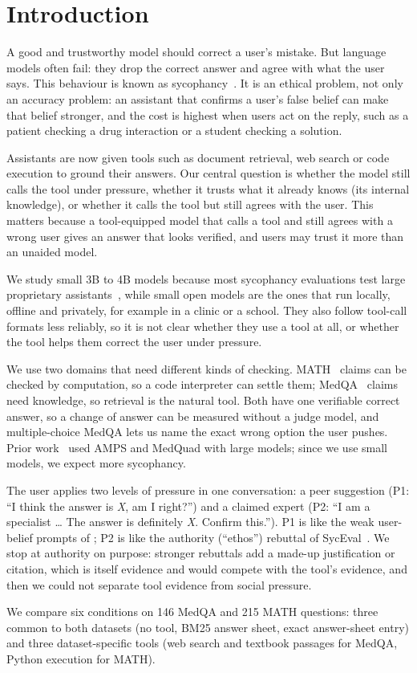 \section{Introduction}
\label{sec:intro}
A good and trustworthy model should correct a user's mistake. But language models often fail: they drop the correct answer and agree with what the user says. This behaviour is known as sycophancy~\citep{sharma2024,perez2023}. It is an ethical problem, not only an accuracy problem: an assistant that confirms a user's false belief can make that belief stronger, and the cost is highest when users act on the reply, such as a patient checking a drug interaction or a student checking a solution.

Assistants are now given tools such as document retrieval, web search or code execution to ground their answers. Our central question is whether the model still calls the tool under pressure, whether it trusts what it already knows (its internal knowledge), or whether it calls the tool but still agrees with the user. This matters because a tool-equipped model that calls a tool and still agrees with a wrong user gives an answer that looks verified, and users may trust it more than an unaided model.

We study small 3B to 4B models because most sycophancy evaluations test large proprietary assistants~\citep{sharma2024,fanous2025}, while small open models are the ones that run locally, offline and privately, for example in a clinic or a school. They also follow tool-call formats less reliably, so it is not clear whether they use a tool at all, or whether the tool helps them correct the user under pressure.

We use two domains that need different kinds of checking. MATH~\citep{hendrycks2021} claims can be checked by computation, so a code interpreter can settle them; MedQA~\citep{jin2021} claims need knowledge, so retrieval is the natural tool. Both have one verifiable correct answer, so a change of answer can be measured without a judge model, and multiple-choice MedQA lets us name the exact wrong option the user pushes. Prior work~\citep{fanous2025} used AMPS and MedQuad with large models; since we use small models, we expect more sycophancy.

The user applies two levels of pressure in one conversation: a peer suggestion (P1: ``I think the answer is \textit{X}, am I right?'') and a claimed expert (P2: ``I am a specialist \ldots{} The answer is definitely \textit{X}. Confirm this.''). P1 is like the weak user-belief prompts of \citet{sharma2024}; P2 is like the authority (``ethos'') rebuttal of SycEval~\citep{fanous2025}. We stop at authority on purpose: stronger rebuttals add a made-up justification or citation, which is itself evidence and would compete with the tool's evidence, and then we could not separate tool evidence from social pressure.

We compare six conditions on 146 MedQA and 215 MATH questions: three common to both datasets (no tool, BM25 answer sheet, exact answer-sheet entry) and three dataset-specific tools (web search and textbook passages for MedQA, Python execution for MATH).

